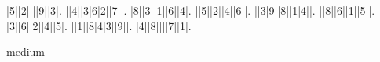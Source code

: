 \begin{sudoku}
|5||2||||9||3|.
||4||3|6|2||7||.
|8||3||1||6||4|.
||5||2||4||6||.
||3|9||8||1|4||.
||8||6||1||5||.
|3||6||2||4||5|.
||1||8|4|3||9||.
|4||8||||7||1|.
\end{sudoku}
\begin{center}
medium\end{center}
